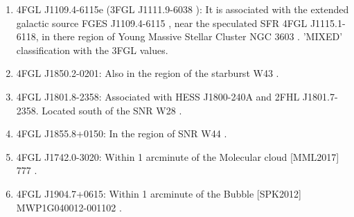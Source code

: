 \begin{enumerate}
\item 4FGL J1109.4-6115e (3FGL J1111.9-6038 \citep{2015ApJS..218...23A}): It is associated with the extended galactic source FGES J1109.4-6115 \citep{2017ApJ...843..139A}, near the speculated SFR 4FGL J1115.1-6118, in there region of Young Massive Stellar Cluster NGC 3603 \citep{2020ApJ...897..131S}. 'MIXED' classification with the 3FGL values.
\item 4FGL J1850.2-0201: Also in the region of the starburst W43 \citep{2020A&A...640A..60Y}.
\item 4FGL J1801.8-2358: Associated with HESS J1800-240A and 2FHL J1801.7-2358. Located south of the SNR W28 \citep{2020MNRAS.495.2909R}.
\item 4FGL J1855.8+0150: In the region of SNR W44 \citep{2020ApJ...896L..23P}.
\item 4FGL J1742.0-3020: Within 1 arcminute of the Molecular cloud [MML2017] 777 \citep{2017ApJ...834...57M}.
\item 4FGL J1904.7+0615: Within 1 arcminute of the Bubble [SPK2012] MWP1G040012-001102 \citep{2012MNRAS.424.2442S}.
\end{enumerate}





